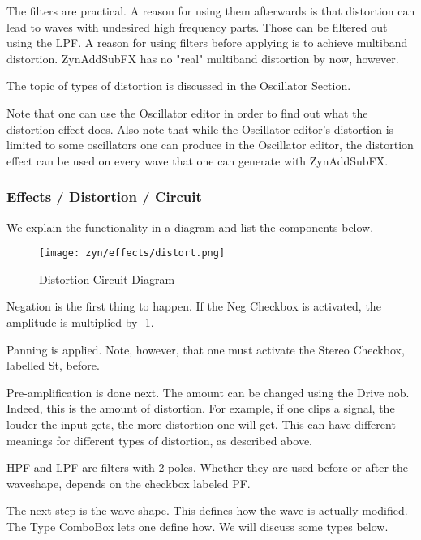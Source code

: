    The filters are practical. A reason for using them afterwards is that
   distortion can lead to waves with undesired high frequency parts. Those
   can be filtered out using the LPF. A reason for using filters before
   applying is to achieve multiband distortion. ZynAddSubFX has no "real"
   multiband distortion by now, however.

   The topic of types of distortion is discussed in the
   Oscillator Section.

   Note that one can use the Oscillator editor in order
   to find out what the distortion effect does. Also note that while the
   Oscillator editor’s distortion is limited to some oscillators one can
   produce in the Oscillator editor, the distortion effect can be used on
   every wave that one can generate with ZynAddSubFX.

\subsubsection{Effects / Distortion / Circuit}
\label{subsubsec:effects_edit_distortion_circuit}

   We explain the functionality in a diagram and list the components below.

\begin{figure}[H]
   \centering 
   \texttt{[image: zyn/effects/distort.png]}
   \caption{Distortion Circuit Diagram}
   \label{fig:distortion_circuit_diagram}
\end{figure}

   Negation is the first thing to happen. If the Neg Checkbox is activated,
   the amplitude is multiplied by -1.

   Panning is applied. Note, however, that one must activate the Stereo
   Checkbox, labelled St, before.

   Pre-amplification is done next. The amount can be changed using the Drive
   nob. Indeed, this is the amount of distortion. For example, if one clips a
   signal, the louder the input gets, the more distortion one will get. This
   can have different meanings for different types of distortion, as
   described above.

   HPF and LPF are filters with 2 poles. Whether they are used before or
   after the waveshape, depends on the checkbox labeled PF.

   The next step is the wave shape. This defines how the wave is actually
   modified. The Type ComboBox lets one define how. We will discuss some
   types below.

